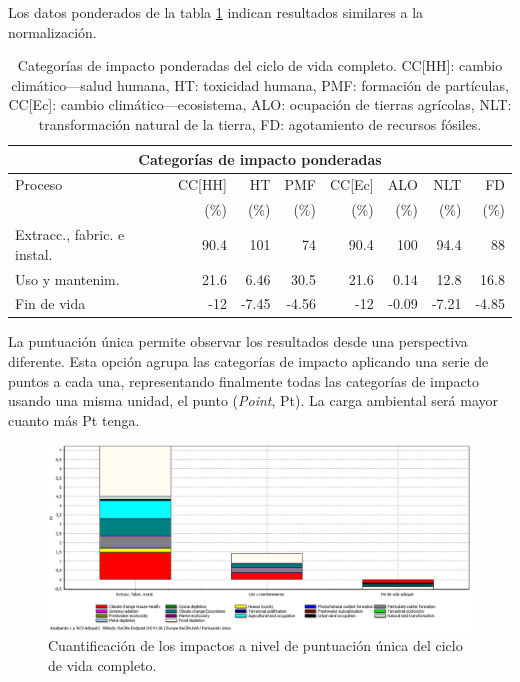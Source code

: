 Los datos ponderados de la tabla \ref{categoriasimpactocompletoponderados} indican resultados similares a la normalización.

\begin{table}[!htb]
\centering
\begin{tabular}{p{4cm}rrrrrrr}
\toprule
\multicolumn{8}{c}{Categorías de impacto ponderadas}\\
\midrule
Proceso & CC[HH] & HT & PMF & CC[Ec] & ALO & NLT & FD\\
 &  (\%) & (\%) & (\%) & (\%) & (\%) & (\%) & (\%)\\
\midrule
Extracc., fabric. e instal. & 90.4 & 101 & 74 & 90.4 & 100 & 94.4 & 88\\
Uso y mantenim. & 21.6 & 6.46 & 30.5 & 21.6 & 0.14 & 12.8 & 16.8\\
Fin de vida & -12 & -7.45 & -4.56 & -12 & -0.09 & -7.21 & -4.85\\
\bottomrule
\end{tabular}
\caption[Categorías de impacto ponderadas del ciclo de vida completo.]{Categorías de impacto ponderadas del ciclo de vida completo. CC[HH]: cambio climático—salud humana, HT: toxicidad humana, PMF: formación de partículas, CC[Ec]: cambio climático—ecosistema, ALO: ocupación de tierras agrícolas, NLT: transformación natural de la tierra, FD: agotamiento de recursos fósiles.}
\label{categoriasimpactocompletoponderados}
\end{table}

La puntuación única permite observar los resultados desde una perspectiva diferente. Esta opción agrupa las categorías de impacto aplicando una serie de puntos a cada una, representando finalmente todas las categorías de impacto usando una misma unidad, el punto (\textit{Point}, Pt). La carga ambiental será mayor cuanto más Pt tenga.

\begin{figure}[!htb]
\centering
\includegraphics[width=15cm]{img/completo_puntuacionunica.png}
\caption{Cuantificación de los impactos a nivel de puntuación única del ciclo de vida completo.}
\label{fig:completo_puntuacionunica}
\end{figure}

